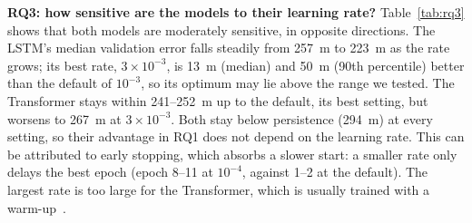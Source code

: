 \documentclass[sigconf]{acmart}
\begin{document}
\textbf{RQ3: how sensitive are the models to their learning rate?} Table~\ref{tab:rq3} shows that both models are moderately sensitive, in opposite directions. The LSTM's median validation error falls steadily from 257~m to 223~m as the rate grows; its best rate, $3{\times}10^{-3}$, is 13~m (median) and 50~m (90th percentile) better than the default of $10^{-3}$, so its optimum may lie above the range we tested. The Transformer stays within 241--252~m up to the default, its best setting, but worsens to 267~m at $3{\times}10^{-3}$. Both stay below persistence (294~m) at every setting, so their advantage in RQ1 does not depend on the learning rate. This can be attributed to early stopping, which absorbs a slower start: a smaller rate only delays the best epoch (epoch 8--11 at $10^{-4}$, against 1--2 at the default). The largest rate is too large for the Transformer, which is usually trained with a warm-up~\cite{vaswani2017attention}.
\end{document}
